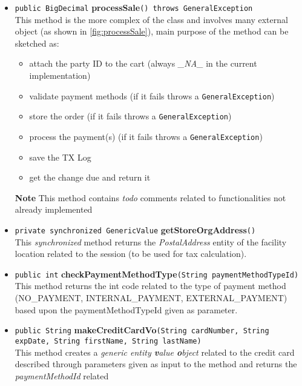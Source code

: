 \begin{itemize}
   \item \label{method:processSale} \texttt{public BigDecimal} \textbf{processSale}\texttt{() throws GeneralException}\\
   This method is the more complex of the class and involves many external object (as shown in \autoref{fig:processSale}), main purpose of the method can be sketched as:
   \begin{itemize}
   		\item attach the party ID to the cart (always \emph{\_NA\_} in the current implementation)
    	\item validate payment methods (if it fails throws a \texttt{GeneralException})
    	\item store the order (if it fails throws a \texttt{GeneralException})
    	\item process the payment(s) (if it fails throws a \texttt{GeneralException})
   		\item save the TX Log
   		\item get the change due and return it
   \end{itemize}
   \textbf{Note} This method contains \emph{todo} comments related to functionalities not already implemented
   \item \texttt{private synchronized GenericValue} \textbf{getStoreOrgAddress}\texttt{()} \\ This \emph{synchronized} method returns the \emph{PostalAddress} entity of the facility location related to the session (to be used for tax calculation).
   \item \texttt{public int} \textbf{checkPaymentMethodType}\texttt{(String paymentMethodTypeId)} \\ This method returns the int code related to the type of payment method (NO\_PAYMENT, INTERNAL\_PAYMENT, EXTERNAL\_PAYMENT) based upon the paymentMethodTypeId given as parameter.
   \item \texttt{public String} \textbf{makeCreditCardVo}\texttt{(String cardNumber, String expDate, String firstName, String lastName)} \\ This method creates a \textit{generic entity \textbf{v}alue \textbf{o}bject} related to the credit card described through parameters given as input to the method and returns the \textit{paymentMethodId} related
\end{itemize}